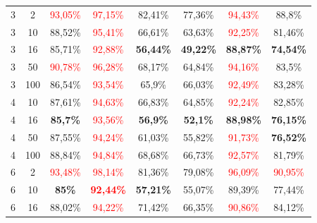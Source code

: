 \begin{table}[ht]
\begin{tabular}{cc|c|c|c|c|c|c}
        {3} & {2}   & \textcolor{red}{93,05\%} & \textcolor{red}{97,15\%}          & {82,41\%}                & {77,36\%}                & \textcolor{red}{94,43\%} & {88,8\%}                 \\
        {3} & {10}  & {88,52\%}                & \textcolor{red}{95,41\%}          & {66,61\%}                & {63,63\%}                & \textcolor{red}{92,25\%} & {81,46\%}                \\
        {3} & {16}  & {85,71\%}                & \textcolor{red}{92,88\%}          & \textbf{56,44\%}         & \textbf{49,22\%}         & \textbf{88,87\%}         & \textbf{74,54\%}         \\
        {3} & {50}  & \textcolor{red}{90,78\%} & \textcolor{red}{96,28\%}          & {68,17\%}                & {64,84\%}                & \textcolor{red}{94,16\%} & {83,5\%}                 \\
        {3} & {100} & {86,54\%}                & \textcolor{red}{93,54\%}          & {65,9\%}                 & {66,03\%}                & \textcolor{red}{92,49\%} & {83,28\%}                \\
        {4} & {10}  & {87,61\%}                & \textcolor{red}{94,63\%}          & {66,83\%}                & {64,85\%}                & \textcolor{red}{92,24\%} & {82,85\%}                \\
        {4} & {16}  & \textbf{85,7\%}          & \textcolor{red}{93,56\%}          & \textbf{56,9\%}          & \textbf{52,1\%}          & \textbf{88,98\%}         & \textbf{76,15\%}         \\
        {4} & {50}  & {87,55\%}                & \textcolor{red}{94,24\%}          & {61,03\%}                & {55,82\%}                & \textcolor{red}{91,73\%} & \textbf{76,52\%}         \\
        {4} & {100} & {88,84\%}                & \textcolor{red}{94,84\%}          & {68,68\%}                & {66,73\%}                & \textcolor{red}{92,57\%} & {81,79\%}                \\
        {6} & {2}   & \textcolor{red}{93,48\%} & \textcolor{red}{98,14\%}          & {81,36\%}                & {79,08\%}                & \textcolor{red}{96,09\%} & \textcolor{red}{90,95\%} \\
        {6} & {10}  & \textbf{85\%}            & \textcolor{red}{\textbf{92,44\%}} & \textbf{57,21\%}         & {55,07\%}                & {89,39\%}                & {77,44\%}                \\
        {6} & {16}  & {88,02\%}                & \textcolor{red}{94,22\%}          & {71,42\%}                & {66,35\%}                & \textcolor{red}{90,86\%} & {84,12\%}                \\

\end{tabular}
\end{table}
